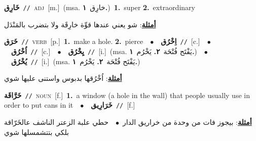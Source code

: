 \documentclass[10pt,a4paper,twoside]{article} %
\begin{document}
\begin{multicols}{2}
{\setlength\topsep{0pt}\textbf{\foreignlanguage{arabic}{خَارِق}}\ {\color{gray}\texttt{//}\color{black}}\ \textsc{adj}\ [m.]\ \color{gray}(msa. \foreignlanguage{arabic}{خارِق}~\foreignlanguage{arabic}{\textbf{١.}})\color{black}\ \textbf{1.}~super  \textbf{2.}~extraordinary\  \begin{flushright}\color{gray}\foreignlanguage{arabic}{\textbf{\underline{\foreignlanguage{arabic}{أمثلة}}}: شو يعني عندها قوِّة خارِقَة ولا بتضرب بالمَنْدَل}\end{flushright}\color{black}} \vspace{2mm}

{\setlength\topsep{0pt}\textbf{\foreignlanguage{arabic}{خَرَق}}\ {\color{gray}\texttt{//}\color{black}}\ \textsc{verb}\ [p.]\ \textbf{1.}~make a hole.  \textbf{2.}~pierce\ \ $\bullet$\ \ \setlength\topsep{0pt}\textbf{\foreignlanguage{arabic}{اِخْرُق}}\ {\color{gray}\texttt{//}\color{black}}\ [c.]\ \ $\bullet$\ \ \setlength\topsep{0pt}\textbf{\foreignlanguage{arabic}{اُخْرُق}}\ {\color{gray}\texttt{//}\color{black}}\ [c.]\ \ $\bullet$\ \ \setlength\topsep{0pt}\textbf{\foreignlanguage{arabic}{يِخْرُق}}\ {\color{gray}\texttt{//}\color{black}}\ [i.]\ \color{gray}(msa. \foreignlanguage{arabic}{يَفْتَح فُتْحَة}~\foreignlanguage{arabic}{\textbf{٢.}}  \foreignlanguage{arabic}{يَخْرُم}~\foreignlanguage{arabic}{\textbf{١.}})\color{black}\ \ $\bullet$\ \ \setlength\topsep{0pt}\textbf{\foreignlanguage{arabic}{يُخْرُق}}\ {\color{gray}\texttt{//}\color{black}}\ [i.]\ \color{gray}(msa. \foreignlanguage{arabic}{يَفْتَح فُتْحَة}~\foreignlanguage{arabic}{\textbf{٢.}}  \foreignlanguage{arabic}{يَخْرُم}~\foreignlanguage{arabic}{\textbf{١.}})\color{black}\  \begin{flushright}\color{gray}\foreignlanguage{arabic}{\textbf{\underline{\foreignlanguage{arabic}{أمثلة}}}: اُخْرُقها بدبوس واستنى عليها شوي}\end{flushright}\color{black}} \vspace{2mm}

{\setlength\topsep{0pt}\textbf{\foreignlanguage{arabic}{خَرَّاقَة}}\ {\color{gray}\texttt{//}\color{black}}\ \textsc{noun}\ [f.]\ \textbf{1.}~a window (a hole in the wall) that people usually use in order to put cans in it\ \ $\bullet$\ \ \setlength\topsep{0pt}\textbf{\foreignlanguage{arabic}{خَرَارِيق}}\ {\color{gray}\texttt{//}\color{black}}\ [f.]\  \begin{flushright}\color{gray}\foreignlanguage{arabic}{\textbf{\underline{\foreignlanguage{arabic}{أمثلة}}}: بيجوز فات من وحدة من خراريق الدار\ $\bullet$\ \  حطي علبة الزعتر الناشف عالخَرّاقة بلكي بتتشمسلها شوي}\end{flushright}\color{black}} \vspace{2mm}


\end{multicols}
\end{document}
